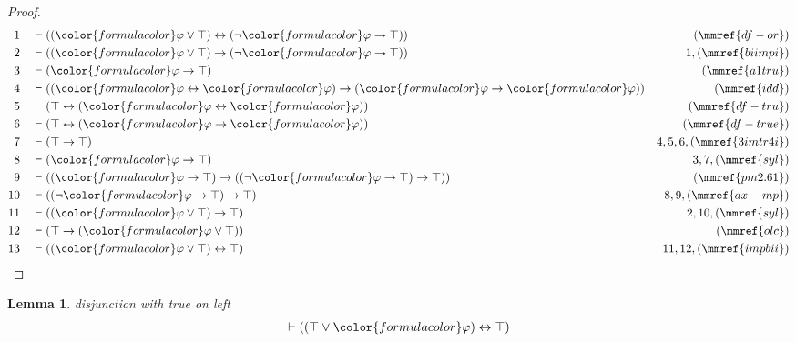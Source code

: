 \documentclass{article}
\theoremstyle{plain}
\newtheorem{lemma}{Theorem}[section]
\newtheorem{lemma}[theorem]{Lemma}
\begin{document}
\begin{proof}
\begin{align}
  1 && & \vdash ( ( {\color{formulacolor}\varphi} \vee \top ) \leftrightarrow (
      \lnot {\color{formulacolor}\varphi} \rightarrow \top
      ) )&(\mmref{df-or})\notag
  \\ 2 && & \vdash ( ( {\color{formulacolor}\varphi} \vee \top ) \rightarrow (
      \lnot {\color{formulacolor}\varphi} \rightarrow \top
      ) )&1,(\mmref{biimpi})\notag
  \\ 3 && & \vdash ( {\color{formulacolor}\varphi} \rightarrow \top
      )&(\mmref{a1tru})\notag
  \\ 4 && & \vdash ( ( {\color{formulacolor}\varphi} \leftrightarrow
      {\color{formulacolor}\varphi} ) \rightarrow (
      {\color{formulacolor}\varphi} \rightarrow
      {\color{formulacolor}\varphi} )
      )&(\mmref{idd})\notag
  \\ 5 && & \vdash ( \top \leftrightarrow ( {\color{formulacolor}\varphi}
      \leftrightarrow {\color{formulacolor}\varphi} )
      )&(\mmref{df-tru})\notag
  \\ 6 && & \vdash ( \top \leftrightarrow ( {\color{formulacolor}\varphi}
      \rightarrow {\color{formulacolor}\varphi} )
      )&(\mmref{df-true})\notag
  \\ 7 && & \vdash ( \top \rightarrow \top )&4,5,6,(\mmref{3imtr4i})\notag
  \\ 8 && & \vdash ( {\color{formulacolor}\varphi} \rightarrow \top
      )&3,7,(\mmref{syl})\notag
  \\ 9 && & \vdash ( ( {\color{formulacolor}\varphi} \rightarrow \top )
      \rightarrow ( ( \lnot {\color{formulacolor}\varphi}
      \rightarrow \top ) \rightarrow \top )
      )&(\mmref{pm2.61})\notag
  \\ 10 && & \vdash ( ( \lnot {\color{formulacolor}\varphi} \rightarrow \top )
      \rightarrow \top )&8,9,(\mmref{ax-mp})\notag
  \\ 11 && & \vdash ( ( {\color{formulacolor}\varphi} \vee \top ) \rightarrow
      \top )&2,10,(\mmref{syl})\notag
  \\ 12 && & \vdash ( \top \rightarrow ( {\color{formulacolor}\varphi} \vee
      \top ) )&(\mmref{olc})\notag
  \\ 13 && & \vdash ( ( {\color{formulacolor}\varphi} \vee \top )
      \leftrightarrow \top )&11,12,(\mmref{impbii})\notag
\end{align}
\end{proof}

\begin{lemma} disjunction with true  on left
\begin{align}
\vdash ( ( \top \vee {\color{formulacolor}\varphi} ) \leftrightarrow \top
    )\label{bl.ortrl}
\end{align}
\end{lemma}
\end{document}
